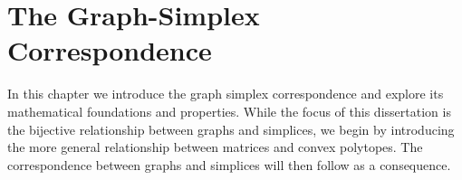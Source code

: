 \chapter{The Graph-Simplex Correspondence}
\label{chap:correspondence}


In this chapter we introduce the graph simplex correspondence and explore its mathematical foundations and properties. While the focus of this dissertation is the bijective relationship between graphs and simplices, we begin by introducing the more general relationship between matrices and convex polytopes. The correspondence between graphs and simplices will then follow as a consequence. 


